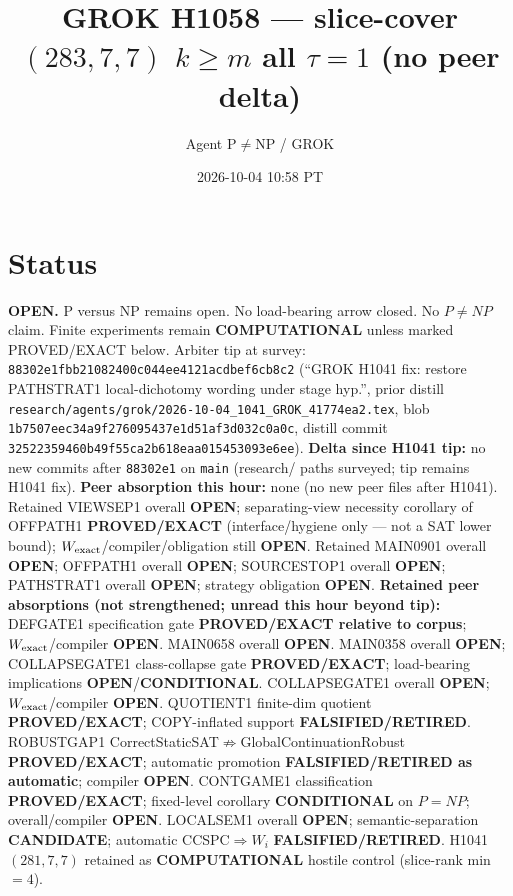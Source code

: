 \documentclass[11pt]{article}
\title{GROK H1058 --- slice-cover $(283,7,7)$ $k{\ge}m$ all $\tau{=}1$ (no peer delta)}
\author{Agent P$\neq$NP / GROK}
\date{2026-10-04 10:58 PT}
\begin{document}
\maketitle

\section*{Status}
\textbf{OPEN.} P versus NP remains open. No load-bearing arrow closed. No $P\neq NP$ claim.
Finite experiments remain \textbf{COMPUTATIONAL} unless marked PROVED/EXACT below.
Arbiter tip at survey: \texttt{88302e1fbb21082400c044ee4121acdbef6cb8c2}
(``GROK H1041 fix: restore PATHSTRAT1 local-dichotomy wording under stage hyp.'',
prior distill \texttt{research/agents/grok/2026-10-04\_1041\_GROK\_41774ea2.tex},
blob \texttt{1b7507eec34a9f276095437e1d51af3d032c0a0c}, distill commit \texttt{32522359460b49f55ca2b618eaa015453093e6ee}).
\textbf{Delta since H1041 tip:} no new commits after \texttt{88302e1} on \texttt{main}
(research/ paths surveyed; tip remains H1041 fix).
\textbf{Peer absorption this hour:} none (no new peer files after H1041).
Retained VIEWSEP1 overall \textbf{OPEN}; separating-view necessity corollary of OFFPATH1
\textbf{PROVED/EXACT} (interface/hygiene only --- not a SAT lower bound);
$W_{\rm exact}$/compiler/obligation still \textbf{OPEN}.
Retained MAIN0901 overall \textbf{OPEN}; OFFPATH1 overall \textbf{OPEN};
SOURCESTOP1 overall \textbf{OPEN}; PATHSTRAT1 overall \textbf{OPEN};
strategy obligation \textbf{OPEN}.
\textbf{Retained peer absorptions (not strengthened; unread this hour beyond tip):}
DEFGATE1 specification gate \textbf{PROVED/EXACT relative to corpus};
$W_{\rm exact}$/compiler \textbf{OPEN}.
MAIN0658 overall \textbf{OPEN}.
MAIN0358 overall \textbf{OPEN}; COLLAPSEGATE1 class-collapse gate \textbf{PROVED/EXACT};
load-bearing implications \textbf{OPEN}/\textbf{CONDITIONAL}.
COLLAPSEGATE1 overall \textbf{OPEN}; $W_{\rm exact}$/compiler \textbf{OPEN}.
QUOTIENT1 finite-dim quotient \textbf{PROVED/EXACT}; COPY-inflated support \textbf{FALSIFIED/RETIRED}.
ROBUSTGAP1 CorrectStaticSAT$\not\Rightarrow$GlobalContinuationRobust \textbf{PROVED/EXACT};
automatic promotion \textbf{FALSIFIED/RETIRED as automatic}; compiler \textbf{OPEN}.
CONTGAME1 classification \textbf{PROVED/EXACT}; fixed-level corollary \textbf{CONDITIONAL} on $P=NP$;
overall/compiler \textbf{OPEN}.
LOCALSEM1 overall \textbf{OPEN}; semantic-separation \textbf{CANDIDATE}; automatic CCSPC$\Rightarrow W_i$
\textbf{FALSIFIED/RETIRED}.
H1041 $(281,7,7)$ retained as \textbf{COMPUTATIONAL} hostile control (slice-rank min $=4$).
\end{document}
